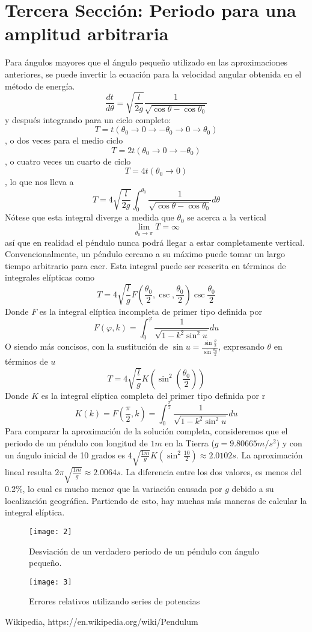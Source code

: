 \documentclass[12 pt,twocolumn]{article}
\begin{document}
\section{\small Tercera Sección: Periodo para una amplitud arbitraria}
Para ángulos mayores que el ángulo pequeño utilizado en las aproximaciones anteriores, se puede invertir la ecuación para la velocidad angular obtenida en el método de energía.
$$\frac{dt}{d\theta}=\sqrt{\frac{l}{2g}}\frac{1}{\sqrt{\cos\theta-\cos\theta_0}}$$
y después integrando para un ciclo completo: $$T=t(\theta_0\to 0\to -\theta_0\to 0\to \theta_0)$$, o dos veces para el medio ciclo $$T=2t(\theta_0\to 0\to-\theta_0)$$, o cuatro veces un cuarto de ciclo $$T=4t(\theta_0\to0)$$, lo que nos lleva a $$T=4\sqrt{\frac{l}{2g}} \int_0^{\theta_0}\frac{1}{\sqrt{\cos\theta-\cos\theta_0}}d\theta$$ Nótese que esta integral diverge a medida que $\theta_0$ se acerca a la vertical $$\lim_{\theta_0\to\pi}T=\infty$$ así que en realidad el péndulo nunca podrá llegar a estar completamente vertical. Convencionalmente, un péndulo cercano a su máximo puede tomar un largo tiempo arbitrario para caer.
Esta integral puede ser reescrita en términos  de integrales elípticas como  $$T=4\sqrt{\frac{l}{g}}F(\frac{\theta_0}{2},\csc,\frac{\theta_0}{2})\csc\frac{\theta_0}{2}$$ Donde $F$ es la integral elíptica incompleta de primer tipo definida por $$F(\varphi,k)=\int_0^\varphi \frac{1}{\sqrt{1-k^2\sin^2u}}du$$ O siendo más concisos, con la sustitución de $ \sin{u}=\frac{\sin{\frac{\theta}{2}}}{\sin{\frac{\theta_0}{2}}}$, expresando $\theta$ en términos de $u$ $$T=4\sqrt{\frac{l}{g}}K(\sin^2(\frac{\theta_0}{2}))$$ Donde $K$ es la integral elíptica completa del primer tipo definida por r$$K(k)=F(\frac{\pi}{2},k)=\int_0^{\frac{\pi}{2}} \frac{1}{\sqrt{1-k^2\sin^2{u}}}du $$ Para comparar la aproximación de la solución completa, consideremos que el periodo de un péndulo con longitud de $1m$ en la Tierra ($g=9.80665 m/s^2$) y con un ángulo inicial de 10 grados es $4\sqrt{\frac{1m}{g}}K(\sin^2{\frac{10}{2}})\approx 2.0102s$. La aproximación lineal resulta $2\pi \sqrt{\frac{1m}{g}}\approx 2.0064s$. La diferencia entre los dos valores, es menos del 0.2\%, lo cual es mucho menor que la variación causada por $g$ debido a su localización geográfica. Partiendo de esto, hay muchas más maneras de calcular la integral elíptica.
\begin{figure}[H]
\centering
\texttt{[image: 2]}
\caption{\footnotesize Desviación de un verdadero periodo de un péndulo con ángulo pequeño.}
\end{figure}


\begin{figure}[H]
\centering
\texttt{[image: 3]}
\caption{\footnotesize Errores relativos utilizando series de potencias }
\end{figure}
\begin{thebibliography}{widestlabel}
 Wikipedia, https://en.wikipedia.org/wiki/Pendulum
\end{thebibliography}
\end{document}
